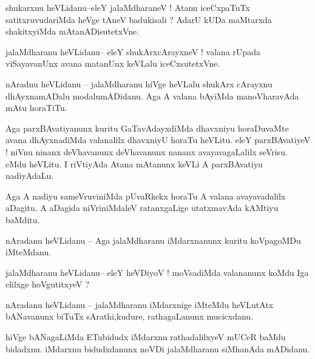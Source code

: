 \documentclass{article}
\begin{document}
\begin{mn}%
shukarxnu heVLidanu--eleY jalaMdharaneV ! Atanu iceCxpaTuTx satitxruvudariMda heVge tAneV 
badukisali ? AdarU kUDa maMtarxda shakitxyiMda mAtanADisutetxVne.
\end{mn}

\begin{mn}%
jalaMdharanu heVLidanu-- eleY shukArxcArayxneV ! valana rUpada viSayavanUnx avana matanUnx 
keVLalu iceCxsutetxVne.
\end{mn}

\begin{mn}%
nAradnu heVLidanu -- jalaMdharanu hiVge heVLalu shukArx cArayxnu dhAyxnamADalu 
modalumADidanu. Aga A valana bAyiMda manoVharavAda mAtu horaTiTu.
\end{mn}

\begin{mn}%
Aga parxBAvatiyanunx kuritu GaTavAdayxdiMda dhavxniyu horaDuvaMte avana dhAyxnadiMda 
valanalilx dhavxniyU horaTu heVLitu. eleY parxBAvatiyeV ! niVnu ninanx deVhavanunx 
deVhavanunx nananx avayavagaLalilx seVrisu. eMdu heVLitu. I riVtiyAda Atana mAtanunx keVLi 
A parxBAvatiyu nadiyAdaLu.
\end{mn}

\begin{mn}%
Aga A nadiyu sameVruviniMda pUvaRkekx horaTu A valana avayavadalilx aDagitu. A aDagida 
niVriniMdaleV ratanxgaLige utatxmavAda kAMtiyu baMditu.
\end{mn}


\begin{mn}%
nAradanu heVLidanu -- Aga jalaMdharanu iMdarxnanunx kuritu koVpagoMDu iMteMdanu. 
\end{mn}

\begin{mn}%
jalaMdharanu heVLidanu-- eleY heVDiyoV ! moVsadiMda valananunx koMdu Iga elilxge hoVgutitxyeV ?
\end{mn}

\begin{mn}%
nAradanu heVLidanu -- jalaMdharanu iMdarxnige iMteMdu heVLutAtx bANavanunx biTuTx 
sArathi,kudure, rathagaLanunx mucicxdanu.
\end{mn}

\begin{mn}%
hiVge bANagaLiMda ETubidudx iMdarxnu rathadalilxyeV mUCeR baMdu bidadxnu. iMdarxnu 
bidudxdanunx noVDi jalaMdharanu siMhanAda mADidanu.
\end{mn}
\end{document}
